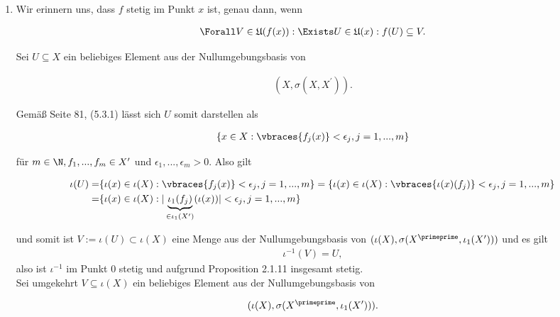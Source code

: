 \begin{solution}

\phantom{}

\begin{enumerate}[label = (\arabic*)]

  \item
  Wir erinnern uns, dass $f$ stetig im Punkt $x$ ist, genau dann, wenn

  \begin{align*}
    \Forall V \in \mathfrak{U}(f(x)):
    \Exists U \in \mathfrak{U}(x):
    f(U) \subseteq V.
  \end{align*}

  Sei $U \subseteq X$ ein beliebiges Element aus der Nullumgebungsbasis von

  \begin{align*}
    (X,\sigma(X,X^{\prime})).
  \end{align*}

  Gemäß Seite 81, (5.3.1) lässt sich $U$ somit darstellen als

  \begin{align*}
    \{x \in X: \vbraces{f_{j}(x)}<\epsilon_j, j=1,...,m\}
  \end{align*}

  für $m \in \N,f_1,...,f_m \in X^{\prime}$ und $\epsilon_1,...,\epsilon_m > 0$.
  Also gilt

  \begin{align*}
    \iota(U) =& \{\iota(x) \in \iota(X): \vbraces{f_{j}(x)}<\epsilon_j, j=1,...,m\} = \{\iota(x) \in \iota(X): \vbraces{\iota(x)(f_{j})}<\epsilon_j, j=1,...,m\} \\
    =& \{\iota(x) \in \iota(X): |\underbrace{\iota_1 (f_{j})}_{\in \iota_1 (X^{\prime})}(\iota(x))|<\epsilon_j, j=1,...,m\}
  \end{align*}

  und somit ist $V := \iota(U) \subset \iota(X)$ eine Menge aus der Nullumgebungsbasis von $(\iota(X),\sigma(X^{\primeprime},\iota_1(X^{\prime})))$ und es gilt
  \begin{align*}
    \iota^{-1}(V) = U,
  \end{align*}
  also ist $\iota^{-1}$ im Punkt $0$ stetig und aufgrund Proposition 2.1.11
  insgesamt stetig. \\
  Sei umgekehrt $V \subseteq \iota(X)$ ein beliebiges Element aus der Nullumgebungsbasis von

  \begin{align*}
    (\iota(X),\sigma(X^{\primeprime},\iota_1(X^{\prime}))).
  \end{align*}


\end{enumerate}
\end{solution}
